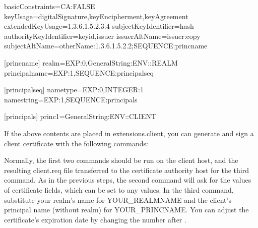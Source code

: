\documentclass[letterpaper,10pt,english]{sphinxmanual}
\begin{document}
\begin{sphinxVerbatim}
basicConstraints=CA:FALSE
keyUsage=digitalSignature,keyEncipherment,keyAgreement
extendedKeyUsage=1.3.6.1.5.2.3.4
subjectKeyIdentifier=hash
authorityKeyIdentifier=keyid,issuer
issuerAltName=issuer:copy
subjectAltName=otherName:1.3.6.1.5.2.2;SEQUENCE:princ\PYGZus{}name

[princ\PYGZus{}name]
realm=EXP:0,GeneralString:\PYGZdl{}\PYGZob{}ENV::REALM\PYGZcb{}
principal\PYGZus{}name=EXP:1,SEQUENCE:principal\PYGZus{}seq

[principal\PYGZus{}seq]
name\PYGZus{}type=EXP:0,INTEGER:1
name\PYGZus{}string=EXP:1,SEQUENCE:principals

[principals]
princ1=GeneralString:\PYGZdl{}\PYGZob{}ENV::CLIENT\PYGZcb{}
\end{sphinxVerbatim}

\sphinxAtStartPar
If the above contents are placed in extensions.client, you can
generate and sign a client certificate with the following commands:

\begin{sphinxVerbatim}[commandchars=\\\{\}]
    
      
     \PYGZbs{}
           \PYGZbs{}
        \PYGZbs{}
       
 
\end{sphinxVerbatim}

\sphinxAtStartPar
Normally, the first two commands should be run on the client host, and
the resulting client.req file transferred to the certificate authority
host for the third command.  As in the previous steps, the second
command will ask for the values of certificate fields, which can be
set to any values.  In the third command, substitute your realm’s name
for YOUR\_REALMNAME and the client’s principal name (without realm) for
YOUR\_PRINCNAME.  You can adjust the certificate’s expiration date by
changing the number after .
\end{document}
